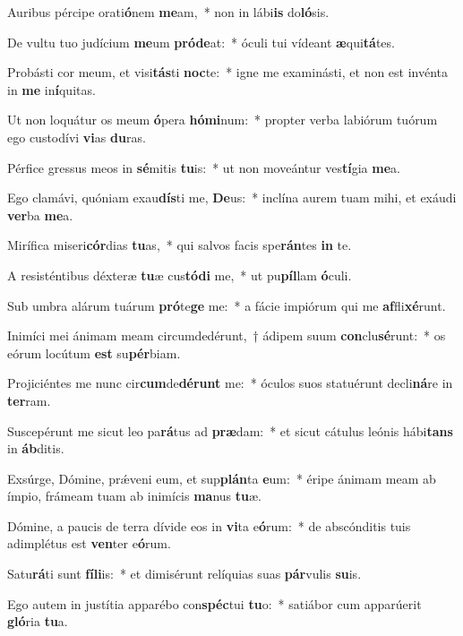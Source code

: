 \item Auribus pércipe orati\textbf{ó}nem \textbf{me}am,~* non in lábi\textbf{is} do\textbf{ló}sis.
\item De vultu tuo judícium \textbf{me}um \textbf{pród}\textbf{e}at:~* óculi tui vídeant \textbf{æ}qui\textbf{tá}tes.
\item Probásti cor meum, et visi\textbf{tás}ti \textbf{noc}te:~* igne me examinásti, et non est invénta in \textbf{me} in\textbf{í}quitas.
\item Ut non loquátur os meum \textbf{ó}pera \textbf{hó}\textbf{mi}num:~* propter verba labiórum tuórum ego custodívi \textbf{vi}as \textbf{du}ras.
\item Pérfice gressus meos in \textbf{sé}mitis \textbf{tu}is:~* ut non moveántur ves\textbf{tí}gia \textbf{me}a.
\item Ego clamávi, quóniam exau\textbf{dís}ti me, \textbf{De}us:~* inclína aurem tuam mihi, et exáudi \textbf{ver}ba \textbf{me}a.
\item Mirífica miseri\textbf{cór}dias \textbf{tu}as,~* qui salvos facis spe\textbf{rán}tes \textbf{in} te.
\item A resisténtibus déxteræ \textbf{tu}æ cus\textbf{tó}\textbf{di} me,~* ut pu\textbf{píl}lam \textbf{ó}culi.
\item Sub umbra alárum tuárum \textbf{pró}te\textbf{ge} me:~* a fácie impiórum qui me \textbf{af}fli\textbf{xé}runt.
\item Inimíci mei ánimam meam circumdedérunt,~† ádipem suum \textbf{con}clu\textbf{sé}runt:~* os eórum locútum \textbf{est} su\textbf{pér}biam.
\item Projiciéntes me nunc cir\textbf{cum}de\textbf{dé}\textbf{runt} me:~* óculos suos statuérunt decli\textbf{ná}re in \textbf{ter}ram.
\item Suscepérunt me sicut leo pa\textbf{rá}tus ad \textbf{præ}dam:~* et sicut cátulus leónis hábi\textbf{tans} in \textbf{áb}ditis.
\item Exsúrge, Dómine, prǽveni eum, et sup\textbf{plán}ta \textbf{e}um:~* éripe ánimam meam ab ímpio, frámeam tuam ab inimícis \textbf{ma}nus \textbf{tu}æ.
\item Dómine, a paucis de terra dívide eos in \textbf{vi}ta e\textbf{ó}rum:~* de abscónditis tuis adimplétus est \textbf{ven}ter e\textbf{ó}rum.
\item Satu\textbf{rá}ti sunt \textbf{fí}\textbf{li}is:~* et dimisérunt relíquias suas \textbf{pár}vulis \textbf{su}is.
\item Ego autem in justítia apparébo con\textbf{spéc}tui \textbf{tu}o:~* satiábor cum apparúerit \textbf{gló}ria \textbf{tu}a.
